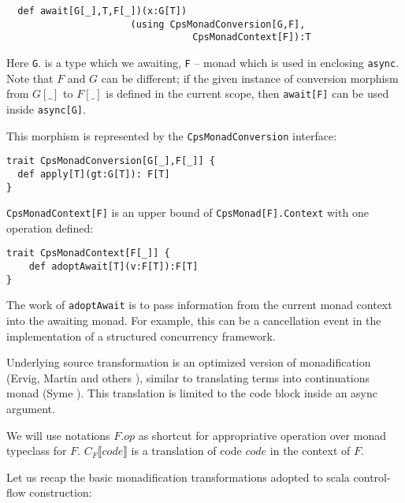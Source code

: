 \documentclass{llncs}
\begin{document}
\begin{lstlisting}
  def await[G[_],T,F[_])(x:G[T])
                      (using CpsMonadConversion[G,F], 
                                 CpsMonadContext[F]):T
\end{lstlisting}

Here \lstinline|G|. is a type which we awaiting, \lstinline|F| -- monad which is used in enclosing \lstinline|async|.
Note that $F$ and $G$ can be different; if the given instance of conversion morphism from $G[\_]$ to $F[\_]$ is defined in the current scope, then \lstinline|await[F]| can be used inside \lstinline|async[G]|. 


 This morphism is represented by the \lstinline|CpsMonadConversion| interface:
 \begin{lstlisting}
trait CpsMonadConversion[G[_],F[_]] {
  def apply[T](gt:G[T]): F[T]
}
\end{lstlisting}

\lstinline|CpsMonadContext[F]| is an upper bound of \lstinline|CpsMonad[F].Context| with one operation defined:

 \begin{lstlisting}
trait CpsMonadContext[F[_]] {
    def adoptAwait[T](v:F[T]):F[T] 
}
\end{lstlisting}
  The work of \lstinline|adoptAwait| is to pass information from the current monad context into the awaiting monad.  For example, this can be a cancellation event in the implementation of a structured concurrency framework.


  Underlying source transformation is an optimized version of monadification (Ervig, Martin and others \cite{10.1016/j.scico.2004.03.004} ), similar to translating terms into continuations monad (Syme \cite{10.1145/174675.178053}). This translation is limited to the code block inside an async argument.  

We will use notations $F.op$ as shortcut for appropriative operation over monad typeclass for $F$. 
$C_F \llbracket code  \rrbracket $ is a translation of code $code$ in the context of $F$.

Let us recap the basic monadification transformations adopted to scala control-flow construction:
\end{document}
